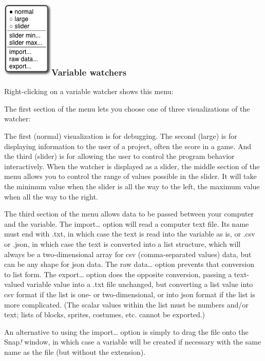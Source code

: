 \subsubsection[Variable
watchers]{\texorpdfstring{\protect\includegraphics[width=0.95833in,height=1.44792in]{media/image1116.png}Variable
watchers}{Macintosh HD:Users:bh:Desktop:watcher-menu.pngVariable watchers}}\label{macintosh-hdusersbhdesktopwatcher-menu.pngvariable-watchers}

Right-clicking on a variable watcher shows this menu:

The first section of the menu lets you choose one of three
visualizations of the watcher:

The first (normal) visualization is for debugging. The second (large) is
for displaying information to the user of a project, often the score in
a game. And the third (slider) is for allowing the user to control the
program behavior interactively. When the watcher is displayed as a
slider, the middle section of the menu allows you to control the range
of values possible in the slider. It will take the minimum value when
the slider is all the way to the left, the maximum value when all the
way to the right.

The third section of the menu allows data to be passed between your
computer and the variable. The import\ldots{} option will read a
computer text file. Its name must end with .txt, in which case the text
is read into the variable as is, or .csv or .json, in which case the
text is converted into a list structure, which will always be a
two-dimensional array for csv (comma-separated values) data, but can be
any shape for json data. The raw data\ldots{} option prevents that
conversion to list form. The export\ldots{} option does the opposite
conversion, passing a text-valued variable value into a .txt file
unchanged, but converting a list value into csv format if the list is
one- or two-dimensional, or into json format if the list is more
complicated. (The scalar values within the list must be numbers and/or
text; lists of blocks, sprites, costumes, etc. cannot be exported.)

An alternative to using the import\ldots{} option is simply to drag the
file onto the Snap\emph{!} window, in which case a variable will be
created if necessary with the same name as the file (but without the
extension).

